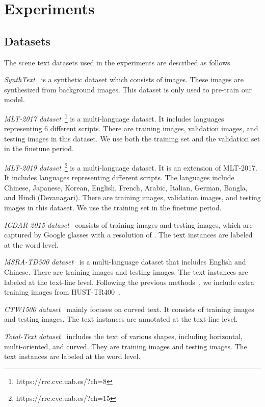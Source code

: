 \section{Experiments}\label{sec:experiments}

\subsection{Datasets}
The scene text datasets used in the experiments are described as follows.

\textit{SynthText}~\cite{SynthText} is a synthetic dataset which consists of  images. These images are synthesized from  background images. This dataset is only used to pre-train our model.

\textit{MLT-2017 dataset}~\footnote{https://rrc.cvc.uab.es/?ch=8} is a multi-language dataset. It includes  languages representing 6 different scripts. There are  training images,  validation images, and  testing images in this dataset. We use both the training set and the validation set in the finetune period.

\textit{MLT-2019 dataset}~\footnote{https://rrc.cvc.uab.es/?ch=15} is a multi-language dataset. It is an extension of MLT-2017. It includes  languages representing  different scripts. The languages include Chinese, Japanese, Korean, English, French, Arabic, Italian, German, Bangla, and Hindi (Devanagari). There are  training images,  validation images, and  testing images in this dataset. We use the training set in the finetune period. 

\textit{ICDAR 2015 dataset}~\cite{icdar15} consists of  training images and  testing images, which are captured by Google glasses with a resolution of . The text instances are labeled at the word level. 

\textit{MSRA-TD500 dataset}~\cite{MSRA} is a multi-language dataset that includes English and Chinese. There are  training images and  testing images. The text instances are labeled at the text-line level. Following the previous methods~\cite{east,lyu2018multi,long2018textsnake}, we include extra  training images from HUST-TR400~\cite{yao2014unified}.

\textit{CTW1500 dataset}~\cite{ctw1500} mainly focuses on curved text. It consists of  training images and  testing images. The text instances are annotated at the text-line level.

\textit{Total-Text dataset}~\cite{totaltext} includes the text of various shapes, including horizontal, multi-oriented, and curved. They are  training images and  testing images. The text instances are labeled at the word level.



